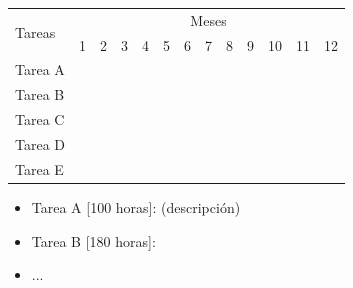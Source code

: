 \documentclass[12pt]{article}
\begin{document}
\begin{center}
    \def\arraystretch{1.5}
    \begin{tabular}{ |l|c|c|c|c|c|c|c|c|c|c|c|c| }

        \hline
        \multirow{2}{1em}{Tareas} & \multicolumn{12}{|c|}{Meses}                                                                                                                                                                      \\  \cline{2-13} &
        1                         & 2                            & 3                & 4                & 5                & 6                & 7                & 8 & 9 & 10 & 11               & 12                                  \\  \hline
        Tarea A                   & \cellcolor{gray}             & \cellcolor{gray} &                  &                  &                  &                  &   &   &    &                  &                  &                  \\
        \hline
        Tarea B                   &                              & \cellcolor{gray} & \cellcolor{gray} &                  &                  &                  &   &   &    &                  &                  &                  \\
        \hline
        Tarea C                   &                              & \cellcolor{gray} & \cellcolor{gray} & \cellcolor{gray} & \cellcolor{gray} & \cellcolor{gray} &   &   &    &                  &                  &                  \\
        \hline
        Tarea D                   &                              &                  &                  &                  &                  &                  &   &   &    &                  &                  &                  \\
        \hline
        Tarea E                   &                              &                  &                  &                  &                  &                  &   &   &    & \cellcolor{gray} & \cellcolor{gray} & \cellcolor{gray} \\
        \hline
    \end{tabular}
\end{center}

\bigskip

\begin{itemize}
    \item Tarea A [100 horas]: (descripción)
    \item Tarea B [180 horas]:
    \item ...
\end{itemize}

\bigskip



\end{document}
